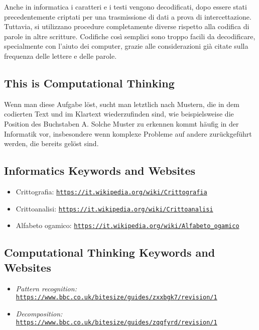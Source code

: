\documentclass[a4paper,11pt]{report}
\newcommand{\BrochureUrlText}[1]{\texttt{#1}}
\begin{document}
Anche in informatica i caratteri e i testi vengono decodificati, dopo essere stati precedentemente criptati per una trasmissione di dati a prova di intercettazione. Tuttavia, si utilizzano procedure completamente diverse rispetto alla codifica di parole in altre scritture. Codifiche così semplici sono troppo facili da decodificare, specialmente con l’aiuto dei computer, grazie alle considerazioni già citate sulla frequenza delle lettere e delle parole.


\subsection*{This is Computational Thinking}

Wenn man diese Aufgabe löst, sucht man letztlich nach Mustern, die in dem codierten Text und im Klartext wiederzufinden sind, wie beispielsweise die Position des Buchstaben A. Solche Muster zu erkennen kommt häufig in der Informatik vor, insbesondere wenn komplexe Probleme auf andere zurückgeführt werden, die bereits gelöst sind.


\subsection*{Informatics Keywords and Websites}

\begin{itemize}
  \item Crittografia: \href{https://it.wikipedia.org/wiki/Crittografia}{\BrochureUrlText{https://it.wikipedia.org/wiki/Crittografia}}
  \item Crittoanalisi: \href{https://it.wikipedia.org/wiki/Crittoanalisi}{\BrochureUrlText{https://it.wikipedia.org/wiki/Crittoanalisi}}
  \item Alfabeto ogamico: \href{https://it.wikipedia.org/wiki/Alfabeto_ogamico}{\BrochureUrlText{https://it.wikipedia.org/wiki/Alfabeto\_ogamico}}
\end{itemize}


\subsection*{Computational Thinking Keywords and Websites}

\begin{itemize}
  \item \emph{Pattern recognition:} \href{https://www.bbc.co.uk/bitesize/guides/zxxbgk7/revision/1}{\BrochureUrlText{https://www.bbc.co.uk/bitesize/guides/zxxbgk7/revision/1}}
  \item \emph{Decomposition:} \href{https://www.bbc.co.uk/bitesize/guides/zqqfyrd/revision/1}{\BrochureUrlText{https://www.bbc.co.uk/bitesize/guides/zqqfyrd/revision/1}}
\end{itemize}
\end{document}
